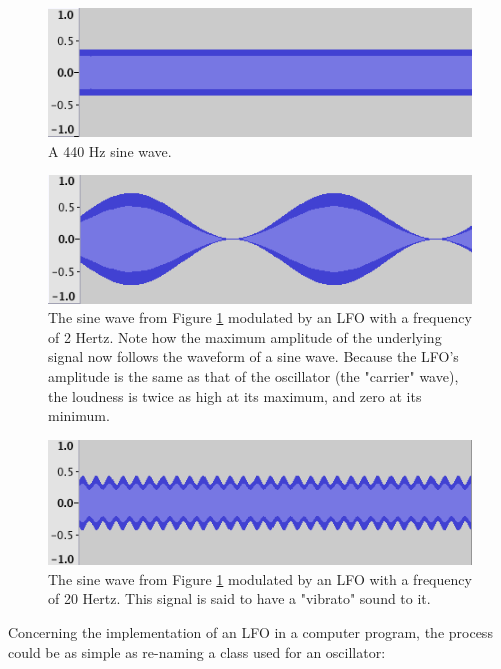 \documentclass[12pt,twoside]{report}
\begin{document}
\begin{figure}[h!]
  \includegraphics[scale=0.5]{img/lfo1}
  \caption{A 440 Hz sine wave.}
  \label{fig:lfo1}
\end{figure}

\begin{figure}[h!]
  \includegraphics[scale=0.5]{img/lfo2}
  \caption{The sine wave from Figure \ref{fig:lfo1} modulated by an LFO with a frequency of 2 Hertz. Note how the maximum amplitude of the underlying signal now follows the waveform of a sine wave. Because the LFO's amplitude is the same as that of the oscillator (the "carrier" wave), the loudness is twice as high at its maximum, and zero at its minimum.}
  \label{fig:lfo2}
\end{figure}

\begin{figure}[h!]
  \includegraphics[scale=0.5]{img/lfo3}
  \caption{The sine wave from Figure \ref{fig:lfo1} modulated by an LFO with a frequency of 20 Hertz. This signal is said to have a "vibrato" sound to it.}
  \label{fig:lfo3}
\end{figure}

\pagebreak

\noindent Concerning the implementation of an LFO in a computer program, the process could be as simple as re-naming a class used for an oscillator:
\end{document}
